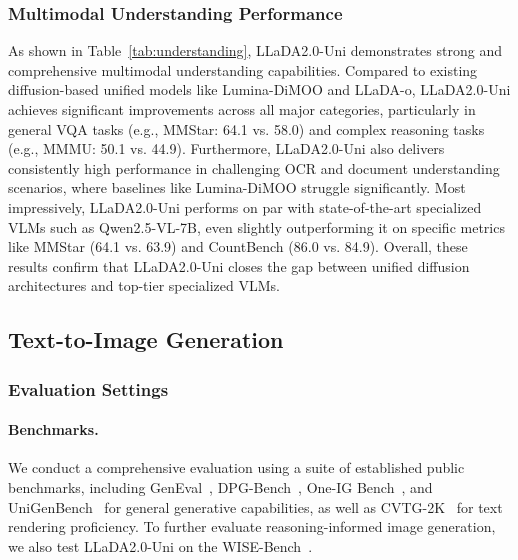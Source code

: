 \subsubsection{Multimodal Understanding Performance}
As shown in Table~\ref{tab:understanding}, LLaDA2.0-Uni demonstrates strong and comprehensive multimodal understanding capabilities.
%
Compared to existing diffusion-based unified models like Lumina-DiMOO and LLaDA-o, LLaDA2.0-Uni achieves significant improvements across all major categories, particularly in general VQA tasks (e.g., MMStar: 64.1 vs. 58.0) and complex reasoning tasks (e.g., MMMU: 50.1 vs. 44.9).
%
Furthermore, LLaDA2.0-Uni also delivers consistently high performance in challenging OCR and document understanding scenarios, where baselines like Lumina-DiMOO struggle significantly.
%
Most impressively, LLaDA2.0-Uni performs on par with state-of-the-art specialized VLMs such as Qwen2.5-VL-7B, even slightly outperforming it on specific metrics like MMStar (64.1 vs. 63.9) and CountBench (86.0 vs. 84.9).
%
Overall, these results confirm that LLaDA2.0-Uni closes the gap between unified diffusion architectures and top-tier specialized VLMs.



\subsection{Text-to-Image Generation}
\subsubsection{Evaluation Settings}
\paragraph{Benchmarks.} 
We conduct a comprehensive evaluation using a suite of established public benchmarks, including GenEval~\citep{ghosh2023geneval}, DPG-Bench~\citep{hu2024ella}, One-IG Bench~\cite{chang2025oneig}, and UniGenBench~\cite{UniGenBench++} for general generative capabilities, as well as CVTG-2K~\citep{du2025textcrafter} for text rendering proficiency. 
%
To further evaluate reasoning-informed image generation, we also test LLaDA2.0-Uni on the WISE-Bench~\citep{niu2025wise}. 

